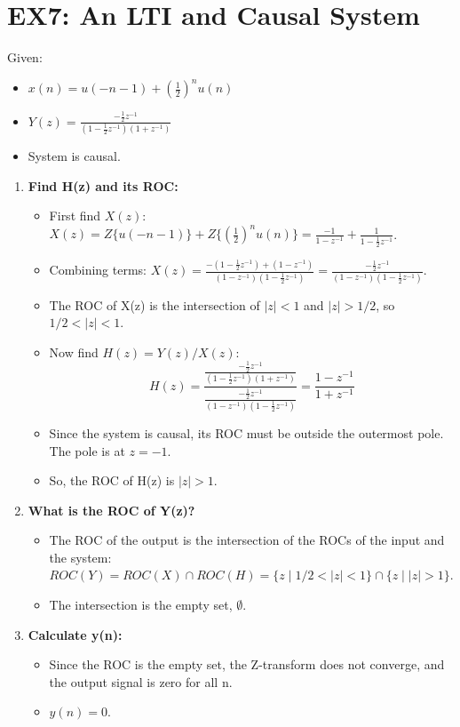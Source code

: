 \documentclass[a4paper,12pt]{article}
\begin{document}
\section*{EX7: An LTI and Causal System}
Given:
\begin{itemize}
    \item $x(n) = u(-n-1) + (\frac{1}{2})^n u(n)$
    \item $Y(z) = \frac{-\frac{1}{2}z^{-1}}{(1-\frac{1}{2}z^{-1})(1+z^{-1})}$
    \item System is causal.
\end{itemize}
\begin{enumerate}
    \item \textbf{Find H(z) and its ROC:}
        \begin{itemize}
            \item First find $X(z)$:
            $X(z) = Z\{u(-n-1)\} + Z\{(\frac{1}{2})^n u(n)\} = \frac{-1}{1-z^{-1}} + \frac{1}{1-\frac{1}{2}z^{-1}}$.
            \item Combining terms: $X(z) = \frac{-(1-\frac{1}{2}z^{-1}) + (1-z^{-1})}{(1-z^{-1})(1-\frac{1}{2}z^{-1})} = \frac{-\frac{1}{2}z^{-1}}{(1-z^{-1})(1-\frac{1}{2}z^{-1})}$.
            \item The ROC of X(z) is the intersection of $|z|<1$ and $|z|>1/2$, so $1/2 < |z| < 1$.
            \item Now find $H(z) = Y(z)/X(z)$:
            \[ H(z) = \frac{\frac{-\frac{1}{2}z^{-1}}{(1-\frac{1}{2}z^{-1})(1+z^{-1})}}{\frac{-\frac{1}{2}z^{-1}}{(1-z^{-1})(1-\frac{1}{2}z^{-1})}} = \frac{1-z^{-1}}{1+z^{-1}} \]
            \item Since the system is causal, its ROC must be outside the outermost pole. The pole is at $z=-1$.
            \item So, the ROC of H(z) is $|z|>1$.
        \end{itemize}
    \item \textbf{What is the ROC of Y(z)?}
        \begin{itemize}
            \item The ROC of the output is the intersection of the ROCs of the input and the system:
            $ROC(Y) = ROC(X) \cap ROC(H) = \{ z \mid 1/2 < |z| < 1 \} \cap \{ z \mid |z| > 1 \}$.
            \item The intersection is the empty set, $\emptyset$.
        \end{itemize}
    \item \textbf{Calculate y(n):}
        \begin{itemize}
            \item Since the ROC is the empty set, the Z-transform does not converge, and the output signal is zero for all n.
            \item $y(n) = 0$.
        \end{itemize}
\end{enumerate}
\end{document}
